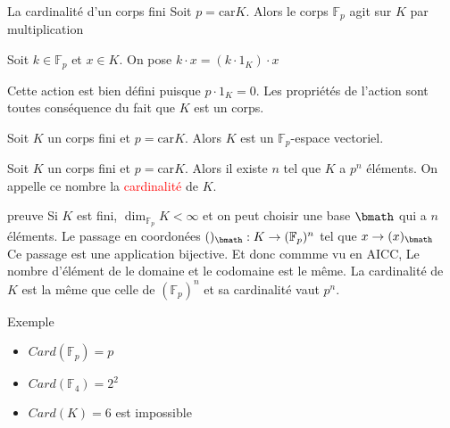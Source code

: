 \begin{parag}{La cardinalité d'un corps fini}
    Soit $p = \text{car}K$. Alors le corps $\mathbb{F}_p$ agit sur $K$ par multiplication
    \begin{definition}
        Soit $k \in \mathbb{F}_p$ et $x \in K$. On pose $k \cdot x = (k\cdot 1_K)\cdot x$
    \end{definition}
    Cette action est bien défini puisque $p\cdot 1_K = 0$. Les propriétés de l'action sont toutes conséquence du fait que $K$ est un corps.
    \begin{proposition}
        Soit $K$ un corps fini et $p = \text{car}K$. Alors $K$ est un $\mathbb{F}_p$-espace vectoriel.
    \end{proposition}
    \begin{theoreme}
        Soit $K$ un corps fini et $p = $car$K$. Alors il existe $n$ tel que $K$ a $p^n$ éléments. On appelle ce nombre la \textcolor{red}{cardinalité} de $K$. 
    \end{theoreme}
    \begin{subparag}{preuve}
        Si $K$ est fini, $\dim_{\mathbb{F}_p}K < \infty$ et on peut choisir une base $\bmath$ qui a $n$ éléments. Le passage en coordonées $()_\bmath : K \to (\mathbb{F}_p)^n$ tel que $x \to (x)_\bmath$
        \\
        Ce passage est une application bijective. Et donc commme vu en AICC, Le nombre d'élément de le domaine et le codomaine est le même. La cardinalité de $K$ est la même que celle de $(\mathbb{F}_p)^n$ et sa cardinalité vaut $p^n$.
    \end{subparag}
    \begin{subparag}{Exemple}
        \begin{itemize}
            \item $Card(\mathbb{F}_p) = p$
            \item  $Card(\mathbb{F}_4) = 2^2$
            \item $Card(K) = 6$ est impossible
        \end{itemize}
    \end{subparag}
\end{parag}

